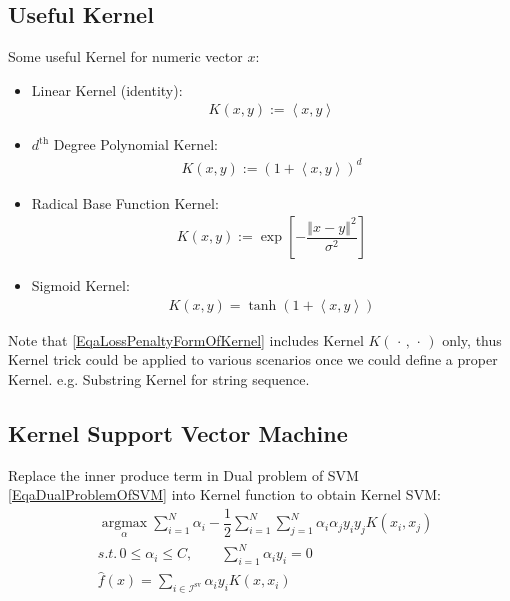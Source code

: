 \subsection{Useful Kernel}
    Some useful Kernel for numeric vector $ x $:
    \begin{itemize}[topsep=2pt,itemsep=0pt]
        \item Linear Kernel (identity):
        \begin{align}
            K(x,y):=\left\langle x,y \right\rangle 
        \end{align}        
        \item $ d^\mathrm{th}  $ Degree Polynomial Kernel:
        \begin{align}
            K(x,y):=\left(1+\left\langle x,y \right\rangle \right)^d
        \end{align}
        \item Radical Base Function Kernel: 
        \begin{align}
            K(x,y):=\exp\left[ -\dfrac{\left\Vert x-y \right\Vert ^2}{\sigma ^2} \right] 
        \end{align}
        \item Sigmoid Kernel: 
        \begin{align}
            K(x,y)=\tanh\left(1+\left\langle x,y \right\rangle \right) 
        \end{align}
    \end{itemize}

    Note that \autoref{EqaLossPenaltyFormOfKernel} includes Kernel $ K(\,\cdot \,,\,\cdot \,) $ only, thus Kernel trick could be applied to various scenarios once we could define a proper Kernel. e.g. Substring Kernel for string sequence.


\subsection{Kernel Support Vector Machine}
    Replace the inner produce term in Dual problem of SVM \autoref{EqaDualProblemOfSVM} into Kernel function to obtain Kernel SVM:
    \begin{align}
         &\mathop{\arg\max}\limits_{\alpha  } \sum_{i=1}^N\alpha  _i-\dfrac{1}{2}\sum_{i=1}^N\sum_{j=1}^N\alpha  _i\alpha  _jy_iy_j K(x_i,x_j) \\
         &s.t.\, 0\leq \alpha _i\leq C,\qquad \sum_{i=1}^N\alpha _iy_i=0\\
         &\hat{f}(x)=\sum_{i\in\mathcal{I}^\mathrm{sv} }\alpha _iy_iK(x,x_i)
    \end{align}


